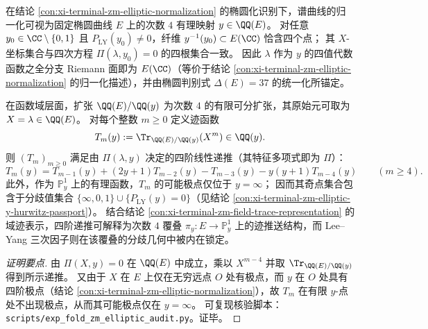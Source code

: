 \begin{conclusion}\label{con:xi-terminal-zm-trace-pushforward-origin}
在结论 \ref{con:xi-terminal-zm-elliptic-normalization} 的椭圆化识别下，谱曲线的归一化可视为固定椭圆曲线 \(E\) 上的次数 \(4\) 有理映射
\(
y\in\QQ(E)
\)。
对任意 \(y_0\in\CC\setminus\{0,1\}\) 且 \(P_{\mathrm{LY}}(y_0)\neq 0\)，纤维 \(y^{-1}(y_0)\subset E(\CC)\) 恰含四个点；
其 \(X\)-坐标集合与四次方程 \(\Pi(\lambda,y_0)=0\) 的四根集合一致。
因此 \(\lambda\) 作为 \(y\) 的四值代数函数之全分支 Riemann 面即为 \(E(\CC)\)（等价于结论 \ref{con:xi-terminal-zm-elliptic-normalization} 的归一化描述），并由椭圆判别式 \(\Delta(E)=37\) 的统一化所锚定。
\par
在函数域层面，扩张 \(\QQ(E)/\QQ(y)\) 为次数 \(4\) 的有限可分扩张，其原始元可取为 \(X=\lambda\in\QQ(E)\)。
对每个整数 \(m\ge 0\) 定义迹函数
\[
T_m(y):=\Tr_{\QQ(E)/\QQ(y)}(X^m)\in\QQ(y).
\]
则 \((T_m)_{m\ge 0}\) 满足由 \(\Pi(\lambda,y)\) 决定的四阶线性递推（其特征多项式即为 \(\Pi\)）：
\[
T_m(y)=T_{m-1}(y)+(2y+1)T_{m-2}(y)-T_{m-3}(y)-y(y+1)T_{m-4}(y)\qquad(m\ge 4).
\]
此外，作为 \(\mathbb P^1_y\) 上的有理函数，\(T_m\) 的可能极点仅位于 \(y=\infty\)；
因而其奇点集合包含于分歧值集合
\(
\{\infty,0,1\}\cup\{P_{\mathrm{LY}}(y)=0\}
\)（见结论 \ref{con:xi-terminal-zm-elliptic-y-hurwitz-passport}）。
结合结论 \ref{con:xi-terminal-zm-field-trace-representation} 的域迹表示，四阶递推可解释为次数 \(4\) 覆叠 \(\pi_y:E\to\mathbb P^1_y\) 上的迹推送结构，而 Lee--Yang 三次因子则在该覆叠的分歧几何中被内在锁定。
\end{conclusion}
\begin{proof}[证明要点]
由 \(\Pi(X,y)=0\) 在 \(\QQ(E)\) 中成立，乘以 \(X^{m-4}\) 并取 \(\Tr_{\QQ(E)/\QQ(y)}\) 得到所示递推。
又由于 \(X\) 在 \(E\) 上仅在无穷远点 \(O\) 处有极点，而 \(y\) 在 \(O\) 处具有四阶极点（结论 \ref{con:xi-terminal-zm-elliptic-normalization}），故 \(T_m\) 在有限 \(y\)-点处不出现极点，从而其可能极点仅在 \(y=\infty\)。
可复现核验脚本：\texttt{scripts/exp\_fold\_zm\_elliptic\_audit.py}。证毕。
\end{proof}


